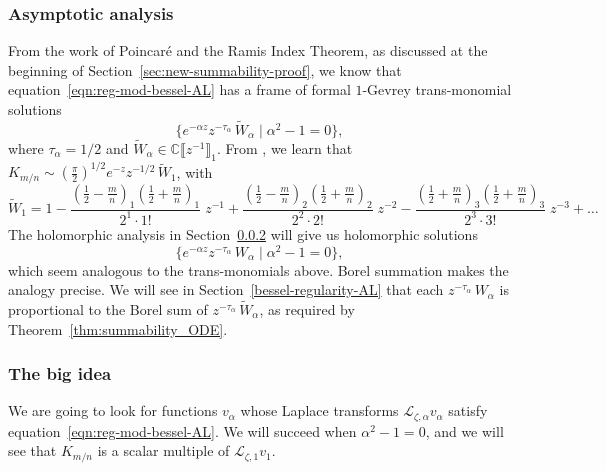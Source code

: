\documentclass{article}
\newcommand{\C}{\mathbb{C}}
\newcommand{\series}[1]{\tilde{#1}}
\newcommand{\laplace}{\mathcal{L}}
\theoremstyle{definition}
\theoremstyle{plain}
\begin{document}
\subsubsection{Asymptotic analysis}\label{sec:asympt-AL}
%
From the work of Poincar\'{e} and the Ramis Index Theorem, as discussed at the beginning of Section~\ref{sec:new-summability-proof}, we know that equation~\eqref{eqn:reg-mod-bessel-AL} has a frame of formal $1$-Gevrey trans-monomial solutions
\[ \{ e^{-\alpha z} z^{-\tau_\alpha}\,\series{W}_\alpha \mid \alpha^2 - 1 = 0 \}, \]
where $\tau_\alpha = 1/2$ and $\series{W}_\alpha\in\C\llbracket z^{-1} \rrbracket_1$. From \cite[equations 10.40.2 and 10.17.1]{dlmf}, we learn that $K_{m/n} \sim \left(\tfrac{\pi}{2}\right)^{1/2} e^{-z} z^{-1/2}\,\series{W}_1$, with
\begin{equation}\label{bessel-asymp-AL}
\series{W}_1 = 1 - \frac{\left(\tfrac{1}{2}-\tfrac{m}{n}\right)_1 \left(\tfrac{1}{2}+\frac{m}{n}\right)_1}{2^1 \cdot 1!}\;z^{-1} + \frac{\left(\tfrac{1}{2}-\tfrac{m}{n}\right)_2 \left(\tfrac{1}{2}+\tfrac{m}{n}\right)_2}{2^2 \cdot 2!}\;z^{-2} - \frac{\left(\tfrac{1}{2}+\tfrac{m}{n}\right)_3 \left(\tfrac{1}{2}+\tfrac{m}{n}\right)_3}{2^3 \cdot 3!}\;z^{-3} + \ldots
\end{equation}
%
The holomorphic analysis in Section~\ref{big-idea} will give us holomorphic solutions
\[ \{ e^{-\alpha z} z^{-\tau_\alpha}\,W_\alpha \mid \alpha^2 - 1 = 0 \}, \]
which seem analogous to the trans-monomials above. Borel summation makes the analogy precise. We will see in Section~\ref{bessel-regularity-AL} that each $z^{-\tau_\alpha}\,W_\alpha$ is proportional to the Borel sum of $z^{-\tau_\alpha}\,\series{W}_\alpha$, as required by Theorem~\ref{thm:summability_ODE}.
%
\subsubsection{The big idea}\label{big-idea}
%
We are going to look for functions $v_\alpha$ whose Laplace transforms $\laplace_{\zeta, \alpha} v_\alpha$ satisfy equation~\eqref{eqn:reg-mod-bessel-AL}. We will succeed when $\alpha^2 - 1 = 0$, and we will see that $K_{m/n}$ is a scalar multiple of $\laplace_{\zeta, 1} v_1$.
\end{document}

